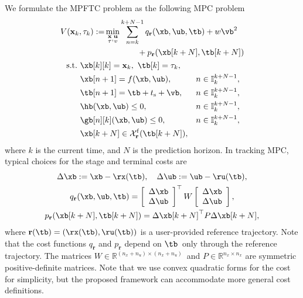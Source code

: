 \documentclass[journal]{IEEEtran}
\newcommand {\matr}[2]{\left[\begin{array}{#1}#2\end{array}\right]}
\newcommand{\x}{{\mathbf{x}}}
\renewcommand{\u}{{\mathbf{u}}}
\newcommand{\vv}{{{v}}}
\renewcommand{\r}{{\mathbf{r}}}
\newcommand{\bx}{{\x}}
\newcommand{\bu}{{\u}}
\newcommand{\btau}{{\tau}}
\newcommand{\bv}{{\vv}}
\newcommand{\review}[1]{#1}
\begin{document}
	We formulate the MPFTC problem as the following MPC problem
	\begin{subequations}
		\label{eq:nmpc}
		\begin{align}
		\begin{split}
		\hspace{-0.5em}V(\x_k,\tau_k):=&\min_{\substack{\bx\\\btau},\substack{\bu\\\bv}}  \sum_{n=k}^{k+N-1}
		q_\r(\xb,\ub,\tb)+w \vb^2 \hspace{-20em}\\
		&\qquad\qquad+p_\r(\xb[k+N],\tb[k+N])\label{eq:nmpc_cost} \hspace{-20em}
		\end{split}\\
		\text{s.t.}\ &\xb[k][k] = \x_{k},\  \tb[k] = \tau_{k}\label{eq:nmpcState}, \\
		&\xb[n+1] = f(\xb,\ub),\label{eq:nmpcDynamics} & n\in \mathbb{I}_k^{k+N-1},\\
		&\tb[n+1] = \tb+t_\mathrm{s}+\vb, \hspace{-0.5em}& n\in \mathbb{I}_k^{k+N-1},\label{eq:tauDynamics}\\
		&\hb(\xb,\ub) \leq{} 0, \label{eq:nmpcInequality_known}& n\in \mathbb{I}_k^{k+N-1},\\
		&\gb[n][k](\xb,\ub) \leq{} 0, 
		\label{eq:nmpcInequality_unknown}& n\in \mathbb{I}_k^{k+N-1},\\
		&\xb[k+N] \in\mathcal{X}^\mathrm{f}_\r(\tb[k+N])\label{eq:nmpcTerminal},
		\end{align}
	\end{subequations}
	where $k$ is the current  time, and $N$ is the prediction horizon. In tracking MPC, typical choices for the stage and terminal costs are
	\begin{gather}
	\Delta\xb := \xb-\rx(\tb),\quad \Delta\ub:=\ub-\ru(\tb), \nonumber\\
	q_\r(\xb,\ub,\tb) = \matr{c}{\Delta\xb\\\Delta\ub}^\top{}W\matr{c}{\Delta\xb\\\Delta\ub},\label{eq:stage_cost}\\
	p_\r(\xb[k+N],\tb[k+N]) = \Delta\xb[k+N]^\top{}P\Delta\xb[k+N],\label{eq:terminal_cost}
	\end{gather}
	where $\r(\tb)=(\rx(\tb),\ru(\tb))$ is a user-provided reference trajectory. \review{Note that the cost functions $q_\r$ and $p_\r$ depend on $\tb$ only through the reference trajectory}. The matrices $W\in\mathbb{R}^{(n_x+n_u) \times (n_x+n_u)}$ and $P\in\mathbb{R}^{n_x\times n_x}$ are symmetric positive-definite matrices. Note that we use convex quadratic forms for the cost for simplicity, but the proposed framework can accommodate more general cost definitions. 
\end{document}
